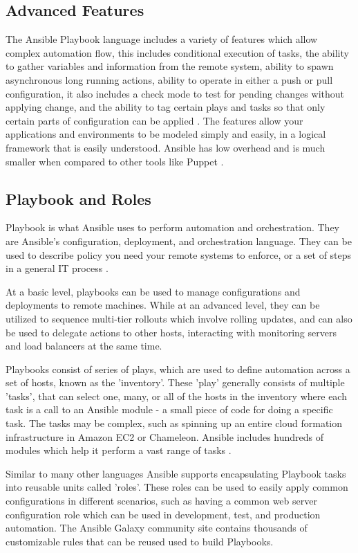 \documentclass[9pt,twocolumn,twoside]{../../styles/osajnl}
\begin{document}
\subsection{Advanced Features}

The Ansible Playbook language includes a variety of features which
allow complex automation flow, this includes conditional execution of
tasks, the ability to gather variables and information from the remote
system, ability to spawn asynchronous long running actions, ability to
operate in either a push or pull configuration, it also includes a
check mode to test for pending changes without applying change, and
the ability to tag certain plays and tasks so that only certain parts
of configuration can be applied \cite{www-ansible3}. The features
allow your applications and environments to be modeled simply and
easily, in a logical framework that is easily understood. Ansible has
low overhead and is much smaller when compared to other tools like
Puppet \cite{www-ansible4}.

\subsection{Playbook and Roles}

Playbook is what Ansible uses to perform automation and
orchestration. They are Ansible's configuration, deployment, and
orchestration language. They can be used to describe policy you need
your remote systems to enforce, or a set of steps in a general IT
process \cite{www-ansible5}.

At a basic level, playbooks can be used to manage configurations and
deployments to remote machines. While at an advanced level, they can
be utilized to sequence multi-tier rollouts which involve rolling
updates, and can also be used to delegate actions to other hosts,
interacting with monitoring servers and load balancers at the same time.

Playbooks consist of series of plays, which are used to define
automation across a set of hosts, known as the 'inventory'. These
'play' generally consists of multiple 'tasks', that can select one,
many, or all of the hosts in the inventory where each task is a call
to an Ansible module - a small piece of code for doing a specific
task. The tasks may be complex, such as spinning up an entire cloud
formation infrastructure in Amazon EC2 or Chameleon. Ansible includes
hundreds of modules which help it perform a vast range of tasks
\cite{www-ansible}.

Similar to many other languages Ansible supports encapsulating
Playbook tasks into reusable units called 'roles'. These roles can be
used to easily apply common configurations in different scenarios,
such as having a common web server configuration role which can be
used in development, test, and production automation. The Ansible
Galaxy community site contains thousands of customizable rules that
can be reused used to build Playbooks.
\end{document}
